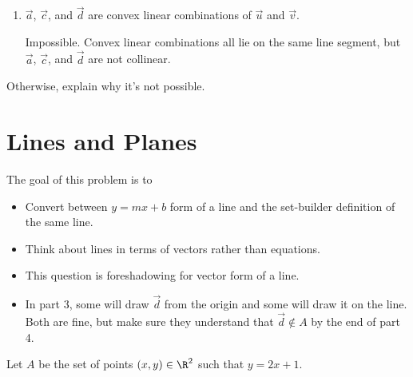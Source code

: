 \documentclass{problemset}
\begin{document}
\begin{parts}
\begin{enumerate}
				\item $\vec a$, $\vec c$, and $\vec d$ are convex linear
					combinations of $\vec u$ and $\vec v$.
				\begin{solution}
					Impossible. Convex linear combinations all lie on the same line segment,
					but $\vec a$, $\vec c$, and $\vec d$ are not collinear.
				\end{solution}
			\end{enumerate}Otherwise, explain why it's not possible.
	\end{parts}

\section*{Lines and Planes}

	\question
	\begin{annotation}
		\begin{goals}
			
			The goal of this problem is to
			\begin{itemize}
				\item Convert between $y=mx+b$ form of a line and
					the set-builder definition of the same line.
				\item Think about lines in terms of vectors rather
					than equations.
			\end{itemize}
		\end{goals}

		\begin{notes}
			\begin{itemize}
				\item This question is foreshadowing for vector form of a line.
				\item In part 3, some will draw $\vec d$ from the origin and
					some will draw it on the line. Both are fine, but make
					sure they understand that $\vec d\notin A$ by the end of
					part 4.
			\end{itemize}
		\end{notes}
	\end{annotation}
	Let $A$ be the set of points $(x,y)\in\R^2$ such that $y=2x+1$.
\end{document}
